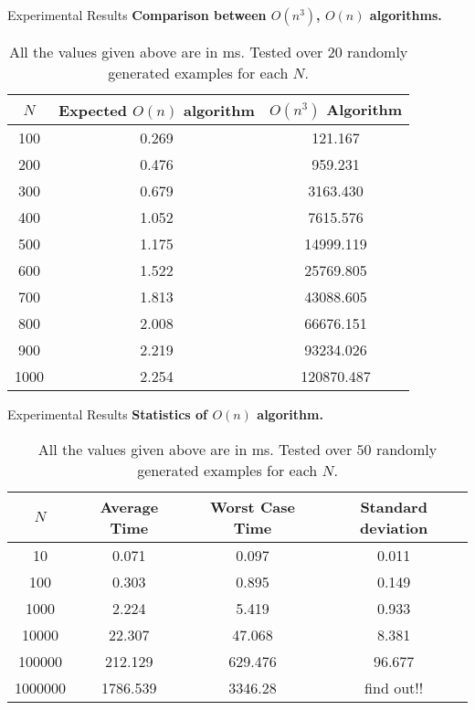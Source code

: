 \documentclass{beamer}
\begin{document}
\begin{frame}{Experimental Results}
\textbf{Comparison between $O(n^3)$, $O(n)$ algorithms.}
\begin{table}
\centering
\begin{tabular}{|c| c |c |} 
 \hline\hline
 $N$ & Expected $O(n)$ algorithm & $O(n^3)$ Algorithm \\ [0.5ex] 
 \hline\hline
100 & 0.269 & 121.167 \\ \hline
200 & 0.476  & 959.231\\ \hline

300 & 0.679 & 3163.430
 \\ \hline

400 & 1.052 & 7615.576
 \\ \hline

500 & 1.175 & 14999.119
 \\ \hline

600 & 1.522 & 25769.805
 \\ \hline

700 & 1.813 & 43088.605
\\ \hline

800 & 2.008 & 66676.151
\\ \hline

900 & 2.219 & 93234.026
 \\ \hline

1000 & 2.254 & 120870.487
\\ \hline
\end{tabular}
\caption{All the values given above are in ms. Tested over $20$ randomly generated examples for each $N$.}
\end{table}
\end{frame}

\begin{frame}{Experimental Results}
\textbf{Statistics of $O(n)$ algorithm.}
\begin{table}
\centering
\begin{tabular}{|c| c |c |c|} 
 \hline\hline
 $N$ & Average Time & Worst Case Time & Standard deviation \\ [0.5ex] 
 \hline\hline
10 & 0.071 & 0.097  & 0.011
 \\ \hline
100 & 0.303 & 0.895 & 0.149
 \\ \hline
1000 & 2.224 & 5.419 & 0.933
 \\ \hline
10000 & 22.307 & 47.068 & 8.381
 \\ \hline
100000 & 212.129 & 629.476 & 96.677
 \\ \hline
1000000 & 1786.539 & 3346.28 & find out!!
 \\ \hline
\end{tabular}
\caption{All the values given above are in ms. Tested over $50$ randomly generated examples for each $N$.}\end{table}
\end{frame}

\begin{frame}
\end{frame}
\end{document}
